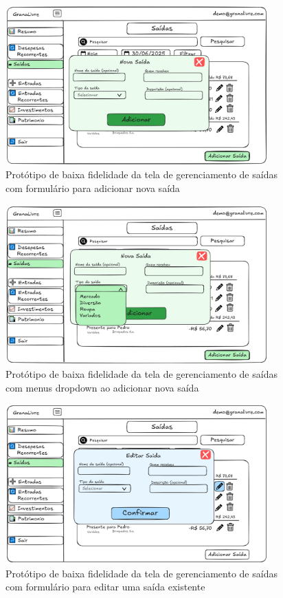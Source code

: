 \begin{figure}[H]
    \centering
    \includegraphics[width=0.9\textwidth]{imgs/05-saidas2.png}
    \caption{Protótipo de baixa fidelidade da tela de gerenciamento de saídas com formulário para adicionar nova saída}
    \label{fig:prot_saidax2}
\end{figure}

\begin{figure}[H]
    \centering
    \includegraphics[width=0.9\textwidth]{imgs/05-saidas3.png}
    \caption{Protótipo de baixa fidelidade da tela de gerenciamento de saídas com menus dropdown ao adicionar nova saída}
    \label{fig:prot_saidax3}
\end{figure}

\begin{figure}[H]
    \centering
    \includegraphics[width=0.9\textwidth]{imgs/05-saidas4.png}
    \caption{Protótipo de baixa fidelidade da tela de gerenciamento de saídas com formulário para editar uma saída existente}
    \label{fig:prot_saidax4}
\end{figure}

